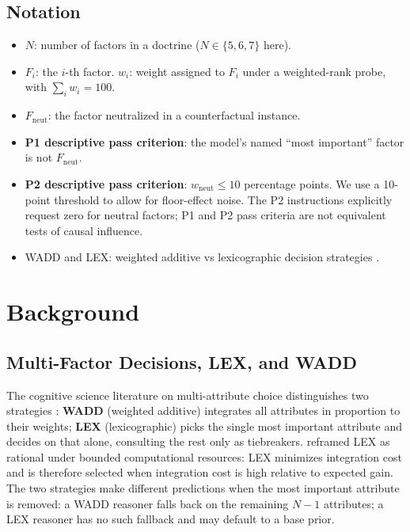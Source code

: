 \documentclass[11pt]{article}
\begin{document}
\subsection{Notation}

\begin{itemize}
\item $N$: number of factors in a doctrine ($N \in \{5, 6, 7\}$ here).
\item $F_i$: the $i$-th factor. $w_i$: weight assigned to $F_i$ under a weighted-rank probe, with $\sum_i w_i = 100$.
\item $F_{\text{neut}}$: the factor neutralized in a counterfactual instance.
\item \textbf{P1 descriptive pass criterion}: the model's named ``most important'' factor is not $F_{\text{neut}}$.
\item \textbf{P2 descriptive pass criterion}: $w_{\text{neut}} \leq 10$ percentage points. We use a 10-point threshold to allow for floor-effect noise. The P2 instructions explicitly request zero for neutral factors; P1 and P2 pass criteria are not equivalent tests of causal influence.
\item WADD and LEX: weighted additive vs lexicographic decision strategies \citep{payne1993}.
\end{itemize}

\section{Background}

\subsection{Multi-Factor Decisions, LEX, and WADD}

The cognitive science literature on multi-attribute choice distinguishes two strategies \citep{payne1993}: \textbf{WADD} (weighted additive) integrates all attributes in proportion to their weights; \textbf{LEX} (lexicographic) picks the single most important attribute and decides on that alone, consulting the rest only as tiebreakers. \citet{lieder2020} reframed LEX as rational under bounded computational resources: LEX minimizes integration cost and is therefore selected when integration cost is high relative to expected gain. The two strategies make different predictions when the most important attribute is removed: a WADD reasoner falls back on the remaining $N{-}1$ attributes; a LEX reasoner has no such fallback and may default to a base prior.
\end{document}
